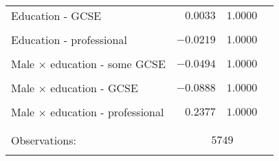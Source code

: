 \documentclass[a4paper,12pt]{article}
\begin{document}
{\begin{threeparttable}
\begin{small}
\begin{tabular}{lrcl}
\\
  \vspace{-0.2cm}Education - GCSE&$0.0033$&$1.0000$&\\
  \\
  \vspace{-0.2cm}Education -  professional&$-0.0219$&$1.0000$&\\
\\
  \vspace{-0.2cm}Male $\times$ education - some GCSE&$-0.0494$&$1.0000$&\\
\\
  \vspace{-0.2cm}Male $\times$ education - GCSE&$-0.0888$&$1.0000$&\\
\\
  \vspace{-0.2cm}Male $\times$ education -  professional&$0.2377$&$1.0000$&\\
\\
\hline
\vspace{-0.4cm} \\ Observations:&    \multicolumn{3}{c}{$5749$} \\  \vspace{-0.4cm}
\\
\hline
\end{tabular} 
\end{small}
  \end{threeparttable} 
\par}
\linespread{1}


\vspace{1.5cm}
\end{document}
